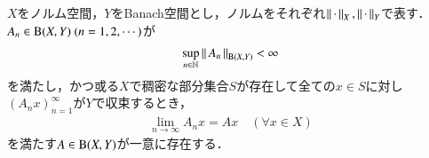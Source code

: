 	\begin{screen}
		\begin{lem}[一様有界な作用素の極限は有界]
			$X$をノルム空間，$Y$をBanach空間とし，ノルムをそれぞれ$\left\|\, \cdot\, \right\|_{X},\left\|\, \cdot\, \right\|_{Y}$で表す．
			$A_n \in \mathrm{B}(X,Y) \ (n=1,2,\cdots)$が
			\begin{align}
				\operatorname*{sup}_{n \in \mathbb{N}} \left\|\, A_n\, \right\|_{\mathrm{B}(X,Y) } < \infty
			\end{align}
			を満たし，かつ或る$X$で稠密な部分集合$S$が存在して全ての$x \in S$に対し
			$\left( A_n x \right)_{n=1}^{\infty}$が$Y$で収束するとき，
			\begin{align}
				\lim_{n \to \infty} A_n x = A x \quad (\forall x \in X)
			\end{align}
			を満たす$A \in \mathrm{B}(X,Y) $が一意に存在する．
		\end{lem}
	\end{screen}
	
